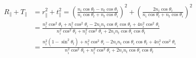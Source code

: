 \documentclass[a4paper]{article}
\begin{document}
\begin{align}
    R_\parallel  + T_\parallel &= r_\parallel^2 + t_\parallel^2 = \left(\frac{n_i \cos \theta_t - n_t \cos \theta_i}{n_i \cos \theta_t + n_t \cos \theta_i}\right)^2 + \left(\frac{2 n_i \cos \theta_i}{n_i \cos \theta_t + n_t \cos \theta_i}\right)^2 \\
    &= \frac{n_i^2 \cos^2 \theta_t + n_t^2 \cos^2 \theta_i - 2 n_i n_t \cos \theta_i \cos \theta_t + 4 n_i^2 \cos^2 \theta_i}{n_i^2 \cos^2 \theta_t + n_t^2 \cos^2 \theta_i + 2 n_i n_t \cos \theta_i \cos \theta_t}\\
    &= \frac{n_i^2 (1 - \sin^2 \theta_t) + n_t^2 \cos^2 \theta_i - 2 n_i n_t \cos \theta_i \cos \theta_t + 4 n_i^2 \cos^2 \theta_i}{n_i^2 \cos^2 \theta_t + n_t^2 \cos^2 \theta_i + 2 n_i n_t \cos \theta_i \cos \theta_t}\\
\end{align}
\end{document}
